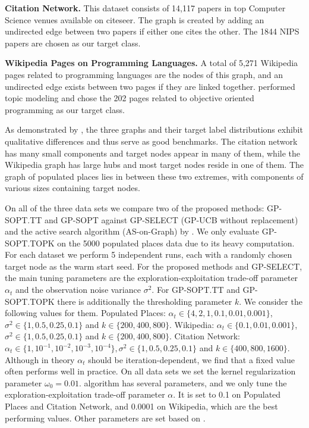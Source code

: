 \textbf{Citation Network.} This dataset consists of 14,117 papers in top Computer Science venues available on citeseer. 
The graph is created by adding an undirected edge between two papers if either one cites the other. The 1844 NIPS papers
are chosen as our target class. 

\textbf{Wikipedia Pages on Programming Languages.} A total of 5,271 Wikipedia pages related to programming languages are the nodes 
of this graph, and an undirected edge exists between two pages if they are linked together. \cite{wang2013active} performed topic 
modeling and chose the 202 pages related to objective oriented programming as our target class.
 
As demonstrated by \cite{wang2013active}, the three graphs and their target label distributions exhibit qualitative differences
and thus serve as good benchmarks. The citation network has many small components and target nodes appear in many of them, 
while the Wikipedia graph has large hubs and most target nodes reside in one of them. 
The graph of populated places lies in between these two extremes, with components of various sizes containing target nodes.   

On all of the three data sets we compare two of the proposed methods: GP-SOPT.TT and GP-SOPT against GP-SELECT (GP-UCB without replacement) 
and the active search algorithm (AS-on-Graph) by \cite{wang2013active}. We only evaluate GP-SOPT.TOPK on the 5000 populated places data
due to its heavy computation. For each dataset we perform 5 independent runs, each with a randomly
chosen target node as the warm start seed. 
For the proposed methods and GP-SELECT, the main tuning parameters  
are the exploration-exploitation trade-off parameter $\alpha_t$ and the observation noise variance $\sigma^2$.
For GP-SOPT.TT and GP-SOPT.TOPK there is additionally the thresholding parameter $k$. 
We consider the following values for them. 
Populated Places: $\alpha_t \in \{4,2,1,0.1,0.01,0.001\}$, $\sigma^2 \in \{1,0.5,0.25,0.1\}$ and $k \in \{200,400,800\}$. 
Wikipedia: $\alpha_t \in \{0.1,0.01,0.001\}$, $\sigma^2 \in \{1,0.5,0.25,0.1\}$ and $k \in \{200,400,800\}$.  
Citation Network: $\alpha_t \in \{1,10^{-1},10^{-2},10^{-3},10^{-4}\}, \sigma^2 \in \{1,0.5,0.25,0.1\}$ and  $k \in \{400,800,1600\}$.
Although in theory $\alpha_t$ should be iteration-dependent, we find that a fixed value often performs well in practice.
On all data sets we set the kernel regularization parameter $\omega_0 = 0.01$.
\cite{wang2013active} algorithm has several parameters, and we only tune the exploration-exploitation trade-off parameter $\alpha$. It is set to 0.1 on Populated Places and Citation Network,
and 0.0001 on Wikipedia, which are the best performing values. Other parameters are set based on \cite{wang2013active}. 


